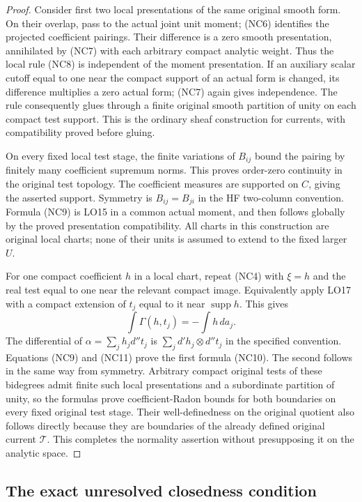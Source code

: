 \begin{proof}
Consider first two local presentations of the same original smooth
form.  On their overlap, pass to the actual joint unit moment;
(NC6) identifies the projected coefficient pairings.  Their difference
is a zero smooth presentation, annihilated by (NC7) with each arbitrary
compact analytic weight.  Thus the local rule (NC8) is independent
of the moment presentation.  If an auxiliary scalar cutoff equal to
one near the compact support of an actual form is changed, its
difference multiplies a zero actual form; (NC7) again gives independence.
The rule consequently glues through a finite original smooth partition
of unity on each compact test support.  This is the ordinary sheaf
construction for currents, with compatibility proved before gluing.

On every fixed local test stage, the finite variations of \(B_{ij}\)
bound the pairing by finitely many coefficient supremum norms.  This
proves order-zero continuity in the original test topology.  The
coefficient measures are supported on \(C\), giving the asserted
support.  Symmetry is \(B_{ij}=B_{ji}\) in the HF two-column
convention.  Formula (NC9) is LO15 in a common actual moment, and
then follows globally by the proved presentation compatibility.
All charts in this construction are original local charts; none of
their units is assumed to extend to the fixed larger \(U\).

For one compact coefficient \(h\) in a local chart, repeat (NC4)
with \(\xi=h\) and the real test equal to one near the relevant
compact image.  Equivalently apply LO17 with a compact extension of
\(t_j\) equal to it near \(\operatorname{supp}h\).  This gives
\[
                    \int\Gamma(h,t_j)=-\int h\,da_j.
 \tag{NC11}
\]
The differential of \(\alpha=\sum_j h_jd''t_j\) is
\(\sum_j d'h_j\otimes d''t_j\) in the specified convention.
Equations (NC9) and (NC11) prove the first formula (NC10).  The
second follows in the same way from symmetry.  Arbitrary compact
original tests of these bidegrees admit finite such local
presentations and a subordinate partition of unity, so the formulas
prove coefficient-Radon bounds for both boundaries on every fixed
original test stage.  Their well-definedness on the original quotient
also follows directly because they are boundaries of the already
defined original current \(\mathcal T\).  This completes the
normality assertion without presupposing it on the analytic space.
\end{proof}

\subsection{The exact unresolved closedness condition}

